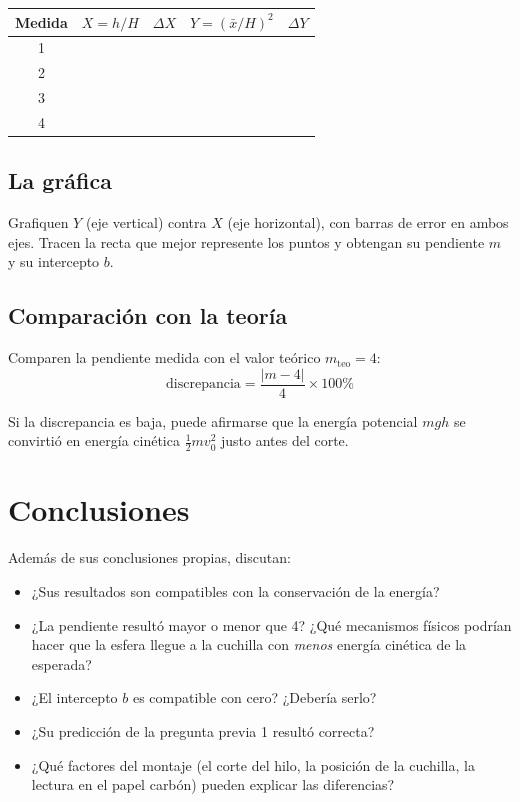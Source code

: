 \documentclass[11pt, letterpaper]{article}
\begin{document}
	\begin{center}
		\small
		\begin{tabular}{|c|c|c|c|c|}
			\hline
			Medida & $X = h/H$ & $\Delta X$ & $Y = (\bar{x}/H)^2$ & $\Delta Y$ \\
			\hline
			\rule{0pt}{3ex} 1 & & & & \\ \hline
			\rule{0pt}{3ex} 2 & & & & \\ \hline
			\rule{0pt}{3ex} 3 & & & & \\ \hline
			\rule{0pt}{3ex} 4 & & & & \\ \hline
		\end{tabular}
	\end{center}
	
	\subsection{La gráfica}
	
	Grafiquen $Y$ (eje vertical) contra $X$ (eje horizontal), con barras de error
	en ambos ejes. Tracen la recta que mejor represente los puntos y obtengan su
	pendiente $m$ y su intercepto $b$.
	
	\subsection{Comparación con la teoría}
	
	Comparen la pendiente medida con el valor teórico $m_{\text{teo}} = 4$:
	\[
	\text{discrepancia} = \frac{|m - 4|}{4}\times 100\%
	\]
	
	\noindent
	Si la discrepancia es baja, puede afirmarse que la energía potencial $mgh$ se
	convirtió en energía cinética $\frac{1}{2}mv_0^2$ justo antes del corte.
	
	\section{Conclusiones}
	
	Además de sus conclusiones propias, discutan:
	
	\begin{itemize}
		\item ¿Sus resultados son compatibles con la conservación de la energía?
		\item ¿La pendiente resultó mayor o menor que 4? ¿Qué mecanismos físicos
		podrían hacer que la esfera llegue a la cuchilla con \emph{menos} energía
		cinética de la esperada?
		\item ¿El intercepto $b$ es compatible con cero? ¿Debería serlo?
		\item ¿Su predicción de la pregunta previa 1 resultó correcta?
		\item ¿Qué factores del montaje (el corte del hilo, la posición de la
		cuchilla, la lectura en el papel carbón) pueden explicar las diferencias?
	\end{itemize}
	
\end{document}
